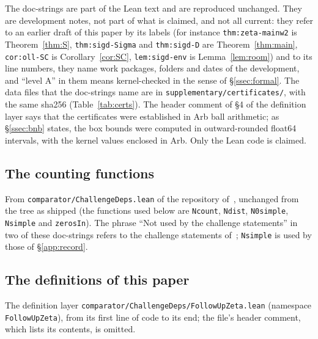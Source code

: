 The doc-strings are part of the Lean text and are reproduced unchanged. They are development notes, not part of what is claimed, and
not all current: they refer to an earlier draft of this paper by its labels (for instance \texttt{thm:zeta-mainw2}
is Theorem~\ref{thm:S}, \texttt{thm:sigd-Sigma} and \texttt{thm:sigd-D} are Theorem~\ref{thm:main}, \texttt{cor:oll-SC} is
Corollary~\ref{cor:SC}, \texttt{lem:sigd-env} is Lemma~\ref{lem:room}) and to its line numbers, they name work packages, folders and
dates of the development, and ``level A'' in them means kernel-checked in the sense of \S\ref{ssec:formal}.
The data files that the doc-strings name are in \texttt{supplementary/certificates/}, with the same sha256 (Table~\ref{tab:certs}). The
header comment of \S4 of the definition layer says that the certificates were established in Arb ball arithmetic; as \S\ref{ssec:bnb} states,
the box bounds were computed in outward-rounded float64 intervals, with the kernel values enclosed in Arb. Only the Lean code is claimed.

\subsection{The counting functions}\label{app:counting}
From \texttt{comparator/ChallengeDeps.lean} of the repository of~\cite{AF}, unchanged from the tree as shipped (the functions used below are
\texttt{Ncount}, \texttt{Ndist}, \texttt{N0simple}, \texttt{Nsimple} and \texttt{zerosIn}). The phrase ``Not used by the challenge
statements'' in two of these doc-strings refers to the challenge statements of~\cite{AF}; \texttt{Nsimple} is used by those of
\S\ref{app:record}.


\subsection{The definitions of this paper}\label{app:defs}
The definition layer \texttt{comparator/ChallengeDeps/FollowUpZeta.lean} (namespace \texttt{FollowUpZeta}), from its first line of code to
its end; the file's header comment, which lists its contents, is omitted.


